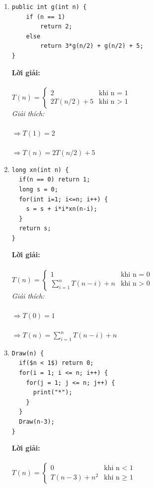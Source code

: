 \documentclass[12pt, letterpaper]{article}
\begin{document}
\begin{enumerate}
	\item \begin{lstlisting}
public int g(int n) {
    if (n == 1)
        return 2;
    else
        return 3*g(n/2) + g(n/2) + 5;
}
    \end{lstlisting}
    \textbf{Lời giải:} \\ \\
    $T(n) =
    \begin{cases}
    2 &\text{khi n = 1} \\
    2T(n/2) + 5 &\text{khi n > 1}
    \end{cases}$ \\

    \textit{Giải thích:} \\
     \\
    $\Rightarrow T(1) = 2$ \\
     \\
    $\Rightarrow T(n) = 2T(n/2) + 5$ \\

	\item \begin{lstlisting}
long xn(int n) {
  if(n == 0) return 1;
  long s = 0;
  for(int i=1; i<=n; i++) {
    s = s + i*i*xn(n-i);
  }
  return s;
}
	\end{lstlisting}
  \textbf{Lời giải:} \\ \\
  $T(n) =
  \begin{cases}
  1 &\text{khi n = 0} \\
  \sum_{i=1}^{n} T(n-i) + n &\text{khi n > 0}
  \end{cases}$ \\

  \textit{Giải thích:} \\
   \\
  $\Rightarrow T(0) = 1$ \\
   \\
  $\Rightarrow T(n) = \sum_{i=1}^{n} T(n-i) + n$ \\


	\item \begin{lstlisting}
Draw(n) {
  if($n < 1$) return 0;
  for(i = 1; i <= n; i++) {
    for(j = 1; j <= n; j++) {
      print("*");
    }
  }
  Draw(n-3);
}
	\end{lstlisting}
  \textbf{Lời giải:} \\ \\
  $T(n) =
  \begin{cases}
  0 &\text{khi n < 1} \\
  T(n-3) + n^2 &\text{khi n $\geq$ 1}
  \end{cases}$ \\


\end{enumerate}
\end{document}
